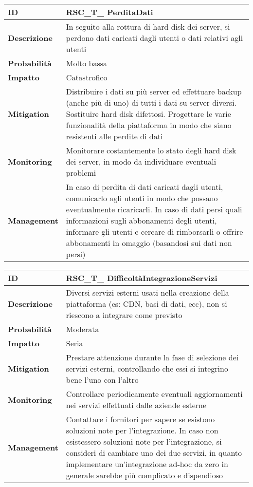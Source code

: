 \begin{tabular}{|p{2.2cm}|p{9.6cm}| } 
 	\hline
	 \textbf{ID} & RSC\_T\_ PerditaDati\\ [0.5ex] 
	\hline
	\textbf{Descrizione} & In seguito alla rottura di hard disk dei server, si perdono dati caricati dagli utenti o dati relativi agli utenti \\ 
	\hline
	\textbf{Probabilità} &  Molto bassa \\ 
	\hline
	\textbf{Impatto} &  Catastrofico \\ 
	\hline
	\textbf{Mitigation} & Distribuire i dati su più server ed effettuare backup (anche più di uno) di tutti i dati su server diversi. Sostituire hard disk difettosi. Progettare le varie funzionalità della piattaforma in modo che siano resistenti alle perdite di dati\\ 
	\hline
	\textbf{Monitoring} & Monitorare costantemente lo stato degli hard disk dei server, in modo da individuare eventuali problemi \\ 
	\hline
	\textbf{Management} & In caso di perdita di dati caricati dagli utenti, comunicarlo agli utenti in modo che possano eventualmente ricaricarli. In caso di dati persi quali informazioni sugli abbonamenti degli utenti, informare gli utenti e cercare di rimborsarli o offrire abbonamenti in omaggio (basandosi sui dati non persi) \\ 
	\hline
\end{tabular}

\begin{tabular}{|p{2.2cm}|p{9.6cm}| } 
 	\hline
	 \textbf{ID} & RSC\_T\_ DifficoltàIntegrazioneServizi\\ [0.5ex] 
	\hline
	\textbf{Descrizione} & Diversi servizi esterni usati nella creazione della piattaforma (es: CDN, basi di dati, ecc), non si riescono a integrare come previsto\\ 
	\hline
	\textbf{Probabilità} &  Moderata\\ 
	\hline
	\textbf{Impatto} &  Seria\\ 
	\hline
	\textbf{Mitigation} & Prestare attenzione durante la fase di selezione dei servizi esterni, controllando che essi si integrino bene l'uno con l'altro\\ 
	\hline
	\textbf{Monitoring} & Controllare periodicamente eventuali aggiornamenti nei servizi effettuati dalle aziende esterne\\ 
	\hline
	\textbf{Management} & Contattare i fornitori per sapere se esistono soluzioni note per l'integrazione. In caso non esistessero soluzioni note per l'integrazione, si consideri di cambiare uno dei due servizi, in quanto implementare un'integrazione ad-hoc da zero in generale sarebbe più complicato e dispendioso\\ 
	\hline
\end{tabular}

